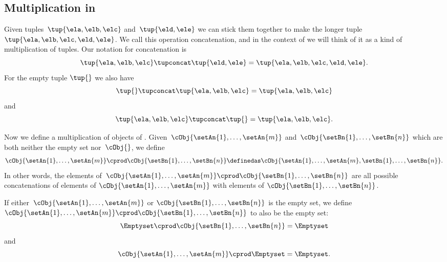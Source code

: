 \subsection{Multiplication in \cCat{\Set}}

Given tuples~$\tup{\ela, \elb, \elc}$ and~$\tup{\eld, \ele}$ we can stick them together to make the longer tuple~$\tup{\ela, \elb, \elc, \eld, \ele}$.
We call this operation concatenation, and in the context of \cCat{\Set} we will think of it as a kind of multiplication of tuples.
Our notation for concatenation is
\begin{equation*}
    \tup{\ela, \elb, \elc} \tupconcat \tup{\eld, \ele} = \tup{\ela, \elb, \elc, \eld, \ele}.
\end{equation*}
For the empty tuple $\tup{  }$ we also have
\begin{equation*}
    \tup{} \tupconcat \tup{\ela, \elb, \elc}  = \tup{\ela, \elb, \elc}
\end{equation*}
and
\begin{equation*}
    \tup{\ela, \elb, \elc}  \tupconcat \tup{ } = \tup{\ela, \elb, \elc}.
\end{equation*}

Now we define a multiplication of objects of \cCat{\Set}.
Given~$\cObj{\setAn{1}, \dots, \setAn{m}}$ and~$\cObj{\setBn{1},  \dots, \setBn{n}}$ which are both neither the empty set nor~$\cObj{}$, we define
\begin{equation*}
    \cObj{\setAn{1}, \dots, \setAn{m}} \cprod \cObj{\setBn{1}, \dots, \setBn{n}} \definedas \cObj{\setAn{1}, \dots, \setAn{m}, \setBn{1},  \dots, \setBn{n}}.
\end{equation*}
In other words, the elements of~$\cObj{\setAn{1}, \dots, \setAn{m}} \cprod \cObj{\setBn{1}, \dots, \setBn{n}}$ are all possible concatenations of elements of $\cObj{\setAn{1}, \dots, \setAn{m}}$ with elements of $\cObj{\setBn{1}, \dots, \setBn{n}}$.

If either~$\cObj{\setAn{1}, \dots, \setAn{m}}$ or $\cObj{\setBn{1}, \dots, \setBn{n}}$ is the empty set, we define $\cObj{\setAn{1}, \dots, \setAn{m}} \cprod \cObj{\setBn{1}, \dots, \setBn{n}}$ to also be the empty set:
\begin{equation*}
    \Emptyset \cprod \cObj{\setBn{1}, \dots, \setBn{n}} = \Emptyset
\end{equation*}
and
\begin{equation*}
    \cObj{\setAn{1}, \dots, \setAn{m}} \cprod \Emptyset = \Emptyset.
\end{equation*}

